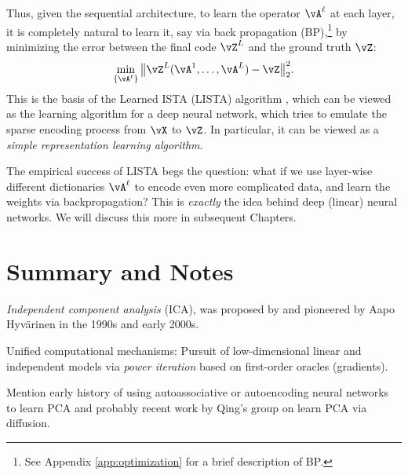 \documentclass[../../book-main.tex]{subfiles}
\begin{document}
Thus, given the sequential architecture, to learn the operator \(\vA^\ell\) at each layer, it is completely natural to learn it, say via back propagation (BP),\footnote{See Appendix \ref{app:optimization} for a brief description of BP.} by minimizing the error between the final code $\vZ^L$ and the ground truth $\vZ$:
\begin{equation}
    \min_{\{\vA^\ell\}} \big\|\vZ^L(\vA^1, \ldots, \vA^{L}) - \vZ\big\|_2^2.
\end{equation}
This is the basis of the Learned ISTA (LISTA) algorithm \cite{gregor2010learning}, which can be viewed as the learning algorithm for a deep  neural network, which tries to emulate the sparse encoding process from $\vX$ to $\vZ$. In particular, it can be viewed as a \textit{simple representation learning algorithm}. 


The empirical success of LISTA begs the question: what if we use layer-wise different  dictionaries \(\vA^\ell\) to encode even more complicated data, and learn the weights via backpropagation? This is \textit{exactly} the idea behind deep (linear) neural networks. We will discuss this more in subsequent Chapters.






\section{Summary and Notes}



\textit{Independent component analysis} (ICA), was proposed by \cite{Ans-1985} and pioneered by Aapo Hyv\"{a}rinen in the 1990s and early 2000s.

Unified computational mechanisms: Pursuit of low-dimensional linear and independent models via {\em power iteration} based on first-order oracles (gradients). 

Mention early history of using autoassociative or autoencoding neural networks to learn PCA and probably recent work by Qing's group on learn PCA via diffusion. 
\end{document}
